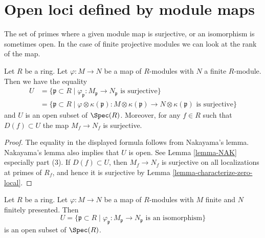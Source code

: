 \section{Open loci defined by module maps}
\label{section-loci-maps}

\noindent
The set of primes where a given module map is surjective, or an isomorphism
is sometimes open. In the case of finite projective modules we can look
at the rank of the map.

\begin{lemma}
\label{lemma-map-between-finite}
Let $R$ be a ring. Let $\varphi : M \to N$ be a map of $R$-modules
with $N$ a finite $R$-module. Then we have the equality
\begin{align*}
U & = \{\mathfrak p \subset R \mid
\varphi_{\mathfrak p} : M_{\mathfrak p} \to N_{\mathfrak p}
\text{ is surjective}\} \\
& = \{\mathfrak p \subset R \mid
\varphi \otimes \kappa(\mathfrak p) :
M \otimes \kappa(\mathfrak p) \to N \otimes \kappa(\mathfrak p)
\text{ is surjective}\}
\end{align*}
and $U$ is an open subset of $\Spec(R)$. Moreover, for any $f \in R$
such that $D(f) \subset U$ the map $M_f \to N_f$ is surjective.
\end{lemma}

\begin{proof}
The equality in the displayed formula follows from Nakayama's lemma.
Nakayama's lemma also implies that $U$ is open. See
Lemma \ref{lemma-NAK} especially part (3). If $D(f) \subset U$, then
$M_f \to N_f$ is surjective on all localizations at primes of
$R_f$, and hence it is surjective by Lemma \ref{lemma-characterize-zero-local}.
\end{proof}

\begin{lemma}
\label{lemma-map-between-finitely-presented}
Let $R$ be a ring. Let $\varphi : M \to N$ be a map of $R$-modules
with $M$ finite and $N$ finitely presented. Then
$$
U = \{\mathfrak p \subset R \mid
\varphi_{\mathfrak p} : M_{\mathfrak p} \to N_{\mathfrak p}
\text{ is an isomorphism}\}
$$
is an open subset of $\Spec(R)$.
\end{lemma}

